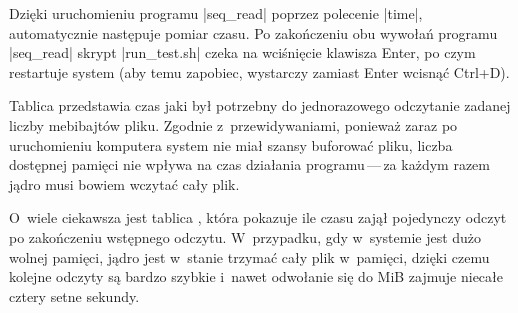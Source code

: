 Dzięki uruchomieniu programu \code|seq_read| poprzez polecenie
\code|time|, automatycznie następuje pomiar czasu.  Po zakończeniu obu
wywołań programu \code|seq_read| skrypt \code|run_test.sh| czeka na
wciśnięcie klawisza Enter, po czym restartuje system (aby temu
zapobiec, wystarczy zamiast Enter wcisnąć Ctrl+D).



Tablica  przedstawia czas jaki był
potrzebny do jednorazowego odczytanie zadanej liczby mebibajtów pliku.
Zgodnie z~przewidywaniami, ponieważ zaraz po uruchomieniu komputera
system nie miał szansy buforować pliku, liczba dostępnej pamięci nie
wpływa na czas działania programu\,---\,za każdym razem jądro musi
bowiem wczytać cały plik.

O~wiele ciekawsza jest tablica ,
która pokazuje ile czasu zajął pojedynczy odczyt po zakończeniu
wstępnego odczytu.  W~przypadku, gdy w~systemie jest dużo wolnej
pamięci, jądro jest w~stanie trzymać cały plik w~pamięci, dzięki czemu
kolejne odczyty są bardzo szybkie i~nawet odwołanie się do
\unit[900]{MiB} zajmuje niecałe cztery setne sekundy.

